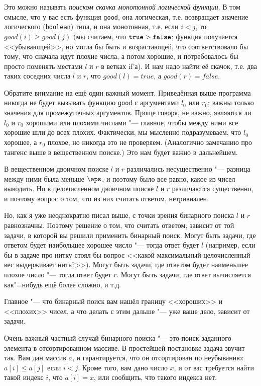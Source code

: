Это можно называть \textit{поиском скачка монотонной логической функции}. 
В том смысле, что у вас есть функция \verb`good`, она логическая, 
т.е. возвращает значение логического (\verb`boolean`) типа,
и она монотонная, т.е. если $i<j$, то $good(i)\geq good(j)$ 
(мы считаем, что $\verb`true`>\verb`false`$; функция получается <<убывающей>>,
но могла бы быть и возрастающей, что соответствовало бы тому,
что сначала идут плохие числа, а потом хорошие, и потребовалось бы просто поменять местами $l$ и $r$
в ветках if'а). 
И нам надо найти её скачок, т.е. два таких соседних числа $l$ и $r$, что $good(l)=true$,
а $good(r)=false$.

Обратите внимание на ещё один важный момент. 
Приведённая выше программа никогда не будет вызывать функцию \verb`good`
с аргументами $l_0$ или $r_0$; важны только значения для промежуточных аргументов.
Проще говоря, не важно, являются ли $l_0$ и $r_0$ хорошими или плохими числами
"--- главное, чтобы между ними все хорошие шли до всех плохих. 
Фактически, мы мысленно подразумеваем, что $l_0$ хорошее, а $r_0$ плохое, но
никогда это не проверяем.
(Аналогично замечанию про тангенс выше в вещественном поиске.)
Это нам будет важно в дальнейшем.

В вещественном двоичном поиске $l$ и $r$ различались несущественно "--- разница между ними
была меньше $\eps$, и поэтому было все равно, какое из чисел выводить. 
Но в целочисленном двоичном поиске $l$ и $r$ различаются существенно, и поэтому
вопрос о том, что из них считать ответом, нетривиален.

Но, как я уже неоднократно писал выше, с точки зрения бинарного поиска $l$ и $r$ равнозначны.
Поэтому решение о том, что считать ответом, зависит от той задачи, в которой
вы решили применить бинарный поиск. 
Могут быть задачи, где ответом будет наибольшее хорошее число "--- тогда ответ будет $l$
(например, если бы в задаче про нитку стоял бы вопрос <<какой максимальный целочисленный вес выдерживает нить?>>).
Могут быть задачи, где ответом будет наименьшее плохое число "--- тогда ответ будет $r$.
Могут быть задачи, где ответ вычисляется как"=нибудь ещё более сложно, и т.д.

Главное "--- что бинарный поиск вам нашёл границу <<хороших>> и <<плохих>> чисел,
а что делать с этим дальше "--- уже ваше дело, зависит от задачи.

Очень важный частный случай бинарного поиска "--- это поиск заданного элемента в отсортированном массиве.
В простейшей постановке задача звучит так.
Вам дан массив $a$, и гарантируется, что он отсортирован по неубыванию: $a[i]\leq a[j]$ если $i<j$.
Кроме того, вам дано число $x$, и от вас требуется найти такой индекс $i$, что $a[i]=x$,
или сообщить, что такого индекса нет.

